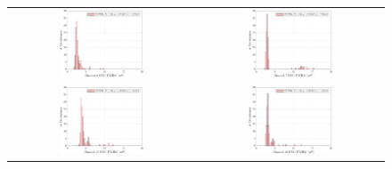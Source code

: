 \begin{figure}[h!]
    \centering
    \begin{tabular}{cc}
        \includegraphics[width=0.475\textwidth]{Images/chap2/results/ENC_0.pdf} & \includegraphics[width=0.475\textwidth]{Images/chap2/results/ENC_7.pdf}\\
        \includegraphics[width=0.475\textwidth]{Images/chap2/results/ENC_15.pdf} & \includegraphics[width=0.475\textwidth]{Images/chap2/results/ENC_16.pdf}\\

\end{tabular}
\end{figure}
